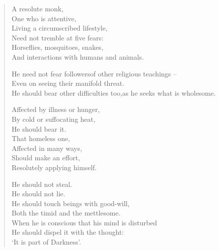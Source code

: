 \begin{verse}

\clearpage

 A resolute monk,\\
One who is attentive,\\
Living a circumscribed lifestyle,\\
Need not tremble at five fears:\\
Horseflies, mosquitoes, snakes,\\
And interactions with humans and animals.


 He need not fear followers\newline of other religious teachings --\\
Even on seeing their manifold threat.\\
He should bear other difficulties too,\newline as he seeks what is wholesome.


 Affected by illness or hunger,\\
By cold or suffocating heat,\\
He should bear it.\\
That homeless one,\\
Affected in many ways,\\
Should make an effort,\\
Resolutely applying himself.


 He should not steal.\\
He should not lie.\\
He should touch beings with good-will,\\
Both the timid and the mettlesome.\\
When he is conscious that his mind is disturbed\\
He should dispel it with the thought:\\
`It is part of Darkness'.


\end{verse}
